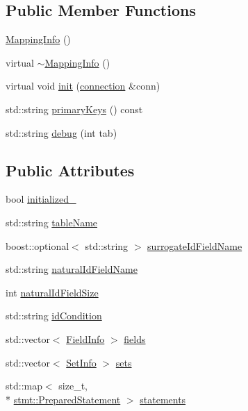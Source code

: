 \subsection*{Public Member Functions}
\begin{DoxyCompactItemize}
\item 
\hyperlink{classdbo_1_1mapping_1_1_mapping_info_ae70d8d648ad6a85496e70114c7f621f5}{Mapping\+Info} ()
\item 
virtual \hyperlink{classdbo_1_1mapping_1_1_mapping_info_a0ee09d7f09d6c82b51c0b0d8944d866c}{$\sim$\+Mapping\+Info} ()
\item 
virtual void \hyperlink{classdbo_1_1mapping_1_1_mapping_info_a1b52b4f58c49b0c7bd64968bae692846}{init} (\hyperlink{classdbo_1_1connection}{connection} \&conn)
\item 
std\+::string \hyperlink{classdbo_1_1mapping_1_1_mapping_info_a0fbeeaedf55ac6c78f72ac8eee28fc97}{primary\+Keys} () const 
\item 
std\+::string \hyperlink{classdbo_1_1mapping_1_1_mapping_info_a1285d681d1338c37b003375de2402739}{debug} (int tab)
\end{DoxyCompactItemize}
\subsection*{Public Attributes}
\begin{DoxyCompactItemize}
\item 
bool \hyperlink{classdbo_1_1mapping_1_1_mapping_info_acb52011c465986c42a13d51143810669}{initialized\+\_\+}
\item 
std\+::string \hyperlink{classdbo_1_1mapping_1_1_mapping_info_acbde5a13cfb34bfc295618d04f5e1b2f}{table\+Name}
\item 
boost\+::optional$<$ std\+::string $>$ \hyperlink{classdbo_1_1mapping_1_1_mapping_info_a8748799b225f75d8f8b9921b9a154dc9}{surrogate\+Id\+Field\+Name}
\item 
std\+::string \hyperlink{classdbo_1_1mapping_1_1_mapping_info_af25df5f23a08b2cd0df50e70e1f8153b}{natural\+Id\+Field\+Name}
\item 
int \hyperlink{classdbo_1_1mapping_1_1_mapping_info_a9002b148bddea56eed799ed55577644f}{natural\+Id\+Field\+Size}
\item 
std\+::string \hyperlink{classdbo_1_1mapping_1_1_mapping_info_a1b0c501e1c8b77b950da36250119fb43}{id\+Condition}
\item 
std\+::vector$<$ \hyperlink{classdbo_1_1mapping_1_1_field_info}{Field\+Info} $>$ \hyperlink{classdbo_1_1mapping_1_1_mapping_info_a07655a3c9ed3ada83735b7ab85775dec}{fields}
\item 
std\+::vector$<$ \hyperlink{structdbo_1_1mapping_1_1_set_info}{Set\+Info} $>$ \hyperlink{classdbo_1_1mapping_1_1_mapping_info_aa1aa365dcdf2b60f13bc7fbb9ec11f3f}{sets}
\item 
std\+::map$<$ size\+\_\+t, \\*
\hyperlink{classdbo_1_1stmt_1_1_prepared_statement}{stmt\+::\+Prepared\+Statement} $>$ \hyperlink{classdbo_1_1mapping_1_1_mapping_info_a3049e05c4e13f8d423f84268720602cd}{statements}
\end{DoxyCompactItemize}


